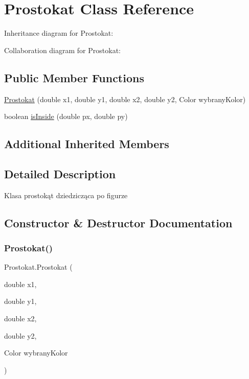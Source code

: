 \hypertarget{classProstokat}{}\section{Prostokat Class Reference}
\label{classProstokat}


Inheritance diagram for Prostokat\+:


Collaboration diagram for Prostokat\+:
\subsection*{Public Member Functions}
\begin{DoxyCompactItemize}
\item 
\hyperlink{classProstokat_a69238d49fca808cea322c4eecbb3b27c}{Prostokat} (double x1, double y1, double x2, double y2, Color wybrany\+Kolor)
\item 
boolean \hyperlink{classProstokat_a167188caec23403d1df09797250bc15b}{is\+Inside} (double px, double py)
\end{DoxyCompactItemize}
\subsection*{Additional Inherited Members}


\subsection{Detailed Description}
Klasa prostokąt dziedzicząca po figurze 

\subsection{Constructor \& Destructor Documentation}
\mbox{\label{classProstokat_a69238d49fca808cea322c4eecbb3b27c}} 
\subsubsection{\texorpdfstring{Prostokat()}{Prostokat()}}
{\footnotesize\ttfamily Prostokat.\+Prostokat (\begin{DoxyParamCaption}\item[{double}]{x1,  }\item[{double}]{y1,  }\item[{double}]{x2,  }\item[{double}]{y2,  }\item[{Color}]{wybrany\+Kolor }\end{DoxyParamCaption})\hspace{0.3cm}{\ttfamily [inline]}}

